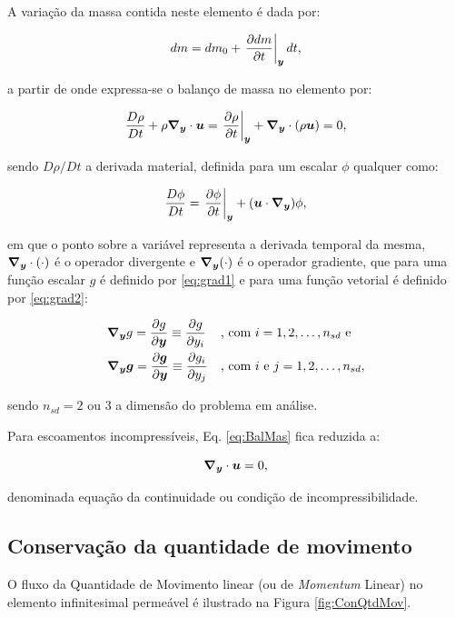 A variação da massa contida neste elemento é dada por:

\begin{equation}
    dm=dm_0+\left.\frac{\partial{dm}}{\partial{t}}\right|_{\boldsymbol{y}}dt\text{,}
\end{equation}

\noindent a partir de onde expressa-se o balanço de massa no elemento por:

\begin{equation}
    \frac{D\rho}{Dt}+\rho \boldsymbol{\nabla_y}\cdot\boldsymbol{u}=\left.\frac{\partial \rho}{\partial t}\right|_{\boldsymbol{y}}+\boldsymbol{\nabla_y}\cdot(\rho \boldsymbol{u})=0\text{,}
    \label{eq:BalMas}
\end{equation}

\noindent sendo $D\rho/Dt$ a derivada material, definida para um escalar $\phi$ qualquer como:

\begin{equation}
    \frac{D\phi}{Dt}=\left.\frac{\partial \phi}{\partial t}\right|_{\boldsymbol{y}}+(\boldsymbol{u}\cdot\boldsymbol{\nabla_y})\phi\text{,}
\end{equation}

\noindent em que o ponto sobre a variável representa a derivada temporal da mesma, $\boldsymbol{\nabla_y}\cdot(\cdot)$ é o operador divergente e $\boldsymbol{\nabla_y}(\cdot)$ é o operador gradiente, que para uma função escalar $g$ é definido por \eqref{eq:grad1} e para uma função vetorial é definido por \eqref{eq:grad2}:

\begin{subequations}
    \begin{align}
         & \boldsymbol{\nabla_y} g=\frac{\partial{g}}{\partial{\boldsymbol{y}}}\equiv\frac{\partial{g}}{\partial{y_i}}            &  & \text{, com }i=1,2,\hdots,n_{sd}\text{ e} \label{eq:grad1}    \\
         & \boldsymbol{\nabla_y}\boldsymbol{g}=\frac{\partial{\boldsymbol{g}}}{\partial{\boldsymbol{y}}}\equiv\frac{\partial{g_i}}{\partial{y_j}} &  & \text{, com }i\text{ e }j=1,2,\hdots,n_{sd}, \label{eq:grad2}
    \end{align}
\end{subequations}

\noindent sendo $n_{sd}=2$ ou $3$ a dimensão do problema em análise.

Para escoamentos incompressíveis, Eq. \eqref{eq:BalMas} fica reduzida a:

\begin{equation}
    \boldsymbol{\nabla_y}\cdot\boldsymbol{u}=0\text{,}\label{eq:incomp}
\end{equation}

\noindent denominada equação da continuidade ou condição de incompressibilidade.

\subsection{Conservação da quantidade de movimento}
O fluxo da Quantidade de Movimento linear (ou de \textit{Momentum} Linear) no elemento infinitesimal permeável é ilustrado na Figura \ref{fig:ConQtdMov}.

